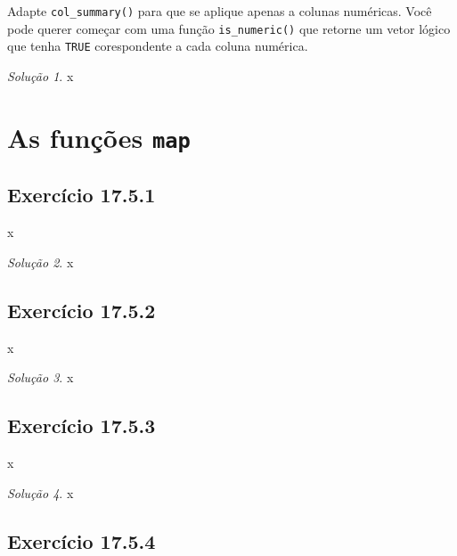 \documentclass[
]{latex/krantz}
\theoremstyle{definition}
\theoremstyle{definition}
\theoremstyle{definition}
\theoremstyle{definition}
\theoremstyle{remark}
\newtheorem*{solution}{Solução}
\begin{document}
Adapte \texttt{col\_summary()} para que se aplique apenas a colunas numéricas. Você pode querer começar com uma função \texttt{is\_numeric()} que retorne um vetor lógico que tenha \texttt{TRUE} corespondente a cada coluna numérica.

\begin{solution}
x
\end{solution}

\hypertarget{as-funuxe7uxf5es-map}{%
\section{\texorpdfstring{As funções \texttt{map}}{As funções map}}\label{as-funuxe7uxf5es-map}}

\hypertarget{exr17-5-1}{%
\subsection*{Exercício 17.5.1}\label{exr17-5-1}}

x

\begin{solution}
x
\end{solution}

\hypertarget{exr17-5-2}{%
\subsection*{Exercício 17.5.2}\label{exr17-5-2}}

x

\begin{solution}
x
\end{solution}

\hypertarget{exr17-5-3}{%
\subsection*{Exercício 17.5.3}\label{exr17-5-3}}

x

\begin{solution}
x
\end{solution}

\hypertarget{exr17-5-4}{%
\subsection*{Exercício 17.5.4}\label{exr17-5-4}}
\end{document}
